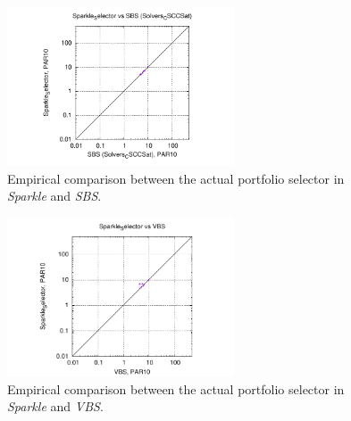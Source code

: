 \documentclass[british]{article}
\begin{document}
\begin{figure}[htbp]
\noindent \begin{centering}
\includegraphics[width=0.6\textwidth]{figure_portfolio_selector_sparkle_vs_sbs}
\par\end{centering}

\caption{Empirical comparison between the actual portfolio selector in \emph{Sparkle} and \emph{SBS}.}\label{fig:sparkle_vs_sbs}
\end{figure}

\begin{figure}[htbp]
\noindent \begin{centering}
\includegraphics[width=0.6\textwidth]{figure_portfolio_selector_sparkle_vs_vbs}
\par\end{centering}

\caption{Empirical comparison between the actual portfolio selector in \emph{Sparkle} and \emph{VBS}.}\label{fig:sparkle_vs_vbs}
\end{figure}





\end{document}
